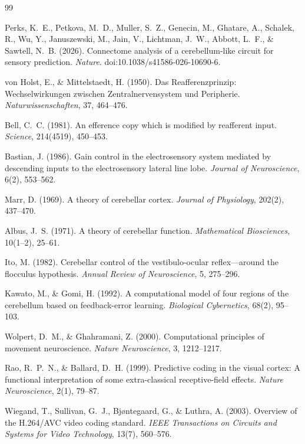 \documentclass[UTF8,12pt,a4paper]{ctexart}
\begin{document}
\begin{thebibliography}{99}

Perks, K.~E., Petkova, M.~D., Muller, S.~Z., Genecin, M., Ghatare, A., Schalek, R., Wu, Y., Januszewski, M., Jain, V., Lichtman, J.~W., Abbott, L.~F., \& Sawtell, N.~B. (2026).
Connectome analysis of a cerebellum-like circuit for sensory prediction.
\emph{Nature}. doi:10.1038/s41586-026-10690-6.

von Holst, E., \& Mittelstaedt, H. (1950).
Das Reafferenzprinzip: Wechselwirkungen zwischen Zentralnervensystem und Peripherie.
\emph{Naturwissenschaften}, 37, 464--476.

Bell, C.~C. (1981).
An efference copy which is modified by reafferent input.
\emph{Science}, 214(4519), 450--453.

Bastian, J. (1986).
Gain control in the electrosensory system mediated by descending inputs to the electrosensory lateral line lobe.
\emph{Journal of Neuroscience}, 6(2), 553--562.

Marr, D. (1969).
A theory of cerebellar cortex.
\emph{Journal of Physiology}, 202(2), 437--470.

Albus, J.~S. (1971).
A theory of cerebellar function.
\emph{Mathematical Biosciences}, 10(1--2), 25--61.

Ito, M. (1982).
Cerebellar control of the vestibulo-ocular reflex---around the flocculus hypothesis.
\emph{Annual Review of Neuroscience}, 5, 275--296.

Kawato, M., \& Gomi, H. (1992).
A computational model of four regions of the cerebellum based on feedback-error learning.
\emph{Biological Cybernetics}, 68(2), 95--103.

Wolpert, D.~M., \& Ghahramani, Z. (2000).
Computational principles of movement neuroscience.
\emph{Nature Neuroscience}, 3, 1212--1217.

Rao, R.~P.~N., \& Ballard, D.~H. (1999).
Predictive coding in the visual cortex: A functional interpretation of some extra-classical receptive-field effects.
\emph{Nature Neuroscience}, 2(1), 79--87.

Wiegand, T., Sullivan, G.~J., Bj{\o}ntegaard, G., \& Luthra, A. (2003).
Overview of the H.264/AVC video coding standard.
\emph{IEEE Transactions on Circuits and Systems for Video Technology}, 13(7), 560--576.


\end{thebibliography}
\end{document}
